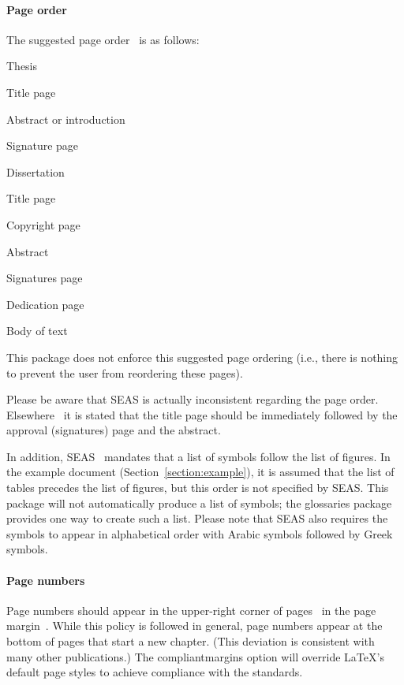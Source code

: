 \documentclass[10pt]{article}
\newcommand{\package}[1]{#1}
\newcommand{\option}[1]{#1}
\begin{document}
\paragraph{Page order}
The suggested page order~\cite{uvaprint:thesis, seas:instructions} is as follows:
\begin{itemize*}
  \item Thesis
  \begin{itemize*}
    \item Title page
    \item Abstract or introduction
    \item Signature page
  \end{itemize*}
  
  \item Dissertation
  \begin{itemize*}
    \item Title page
    \item Copyright page
    \item Abstract
    \item Signatures page
    \item Dedication page
    \item Body of text
  \end{itemize*}
\end{itemize*}
This package does not enforce this suggested page ordering (i.e., there is nothing to prevent the user from reordering these pages).

Please be aware that \gls{SEAS} is actually inconsistent regarding the page order.
Elsewhere~\cite{seas:instructions} it is stated that the title page should be immediately followed by the approval (signatures) page and the abstract.

In addition, \gls{SEAS}~\cite{seas:instructions} mandates that a list of symbols follow the list of figures.
In the example document (Section~\ref{section:example}), it is assumed that the list of tables precedes the list of figures, but this order is not specified by \gls{SEAS}.
This package will not automatically produce a list of symbols; the \package{glossaries} package provides one way to create such a list.
Please note that \gls{SEAS} also requires the symbols to appear in alphabetical order with Arabic symbols followed by Greek symbols.

\paragraph{Page numbers}
Page numbers should appear in the upper-right corner of pages~\cite{uvaprint:thesis} in the page margin~\cite{seas:instructions}.
While this policy is followed in general, page numbers appear at the bottom of pages that start a new chapter.
(This deviation is consistent with many other publications.)
The \option{compliantmargins} option will override \LaTeX's default page styles to achieve compliance with the standards.
\end{document}
